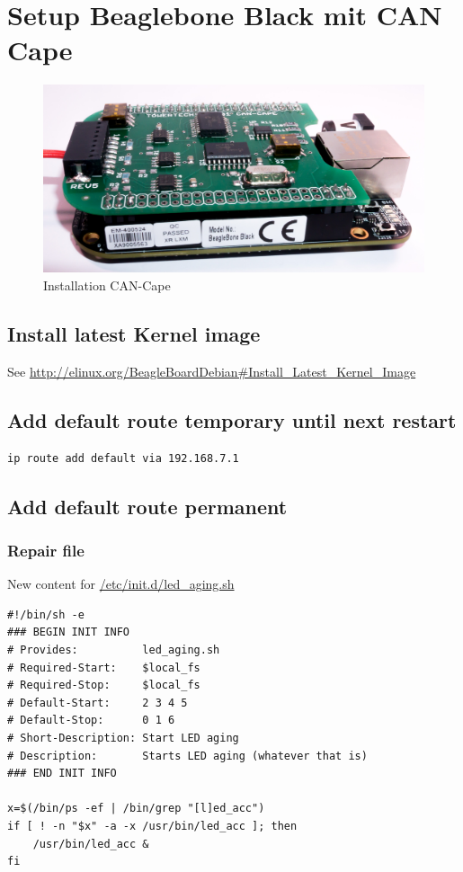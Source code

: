 \chapter{Setup Beaglebone Black mit CAN Cape}
\label{chap:setupbeaglebone}

\begin{figure}[hbtp]
    \center
    \includegraphics[width=\textwidth]{bilder/foto-3.jpg}
    \caption{Installation CAN-Cape}
    \label{fig:installation_can_cape}
\end{figure}


\section{Install latest Kernel image }
See \url{http://elinux.org/BeagleBoardDebian#Install_Latest_Kernel_Image}

\section{Add default route temporary until next restart}

\begin{lstlisting}
ip route add default via 192.168.7.1
\end{lstlisting}

\section{Add default route permanent}

\subsection{Repair file}

New content for \url{/etc/init.d/led_aging.sh}

\begin{lstlisting}
#!/bin/sh -e
### BEGIN INIT INFO
# Provides:          led_aging.sh
# Required-Start:    $local_fs
# Required-Stop:     $local_fs
# Default-Start:     2 3 4 5
# Default-Stop:      0 1 6
# Short-Description: Start LED aging
# Description:       Starts LED aging (whatever that is)
### END INIT INFO

x=$(/bin/ps -ef | /bin/grep "[l]ed_acc")
if [ ! -n "$x" -a -x /usr/bin/led_acc ]; then
    /usr/bin/led_acc &
fi
\end{lstlisting}


